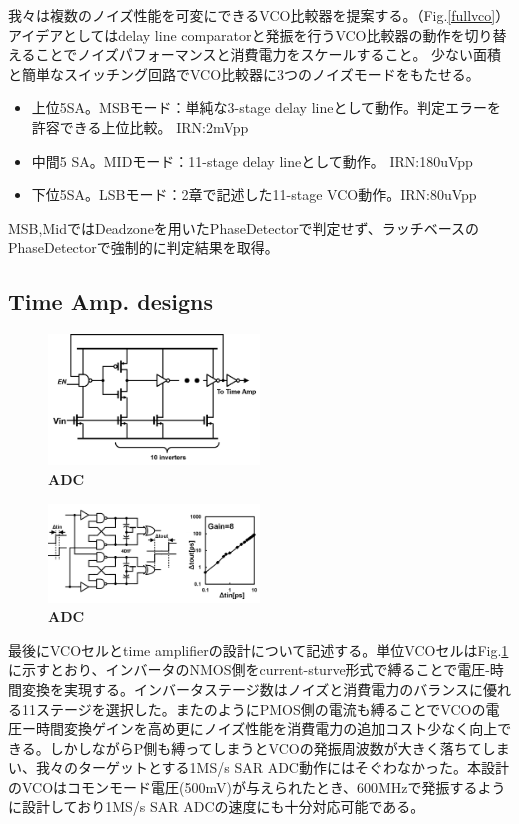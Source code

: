 \documentclass[letterpaper, 10 pt, conference]{ieeeconf}  %
\begin{document}
我々は複数のノイズ性能を可変にできるVCO比較器を提案する。（Fig.\ref{fullvco}）
アイデアとしてはdelay line comparatorと発振を行うVCO比較器の動作を切り替えることでノイズパフォーマンスと消費電力をスケールすること。
少ない面積と簡単なスイッチング回路でVCO比較器に3つのノイズモードをもたせる。

\begin{itemize}
\item 上位5SA。MSBモード：単純な3-stage delay lineとして動作。判定エラーを許容できる上位比較。 IRN:2mVpp
\item 中間5 SA。MIDモード：11-stage delay lineとして動作。 IRN:180uVpp
\item 下位5SA。LSBモード：2章で記述した11-stage VCO動作。IRN:80uVpp
\end{itemize}

MSB,MidではDeadzoneを用いたPhaseDetectorで判定せず、ラッチベースのPhaseDetectorで強制的に判定結果を取得。

\subsection{Time Amp. designs}
\begin{figure}[ht!]
\centering
 \includegraphics[width=0.5\textwidth]{figs/vco_cell.png}
  \captionsetup{font=footnotesize}
  \caption{\textbf{ADC}}
  \label{cell}
\end{figure}

\begin{figure}[ht!]
\centering
 \includegraphics[width=0.5\textwidth]{figs/ta_chara.png}
  \captionsetup{font=footnotesize}
  \caption{\textbf{ADC}}
  \label{timeamp}
\end{figure}

最後にVCOセルとtime amplifierの設計について記述する。単位VCOセルはFig.\ref{cell}に示すとおり、インバータのNMOS側をcurrent-sturve形式で縛ることで電圧-時間変換を実現する。インバータステージ数はノイズと消費電力のバランスに優れる11ステージを選択した。また\cite{lee20089}のようにPMOS側の電流も縛ることでVCOの電圧ー時間変換ゲインを高め更にノイズ性能を消費電力の追加コスト少なく向上できる。しかしながらP側も縛ってしまうとVCOの発振周波数が大きく落ちてしまい、我々のターゲットとする1MS/s SAR ADC動作にはそぐわなかった。本設計のVCOはコモンモード電圧(500mV)が与えられたとき、600MHzで発振するように設計しており1MS/s SAR ADCの速度にも十分対応可能である。
\end{document}
